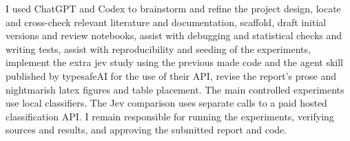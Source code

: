 I used ChatGPT and Codex to brainstorm and refine the project design, locate and cross-check relevant literature and documentation, scaffold, draft initial versions and review notebooks, assist with debugging and statistical checks and writing tests, assist with reproducibility and seeding of the experiments, implement the extra jev study using the previous made code and the agent skill published by typesafeAI for the use of their API, revise the report's prose and nightmarish latex figures and table placement. The main controlled experiments use local classifiers. The Jev comparison uses separate calls to a paid hosted classification API. I remain responsible for running the experiments, verifying sources and results, and approving the submitted report and code.
